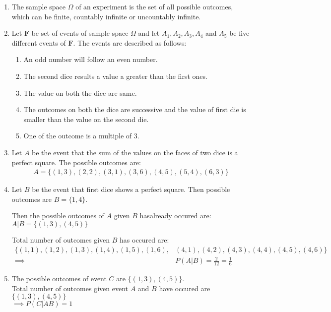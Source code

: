 \documentclass[11pt]{article}
\begin{document}
\begin{enumerate}[{1}($a$): ]
\item The sample space $\Omega$ of an experiment is the set of all possible 
	outcomes, which can be finite, countably infinite or uncountably 
	infinite.
\item Let $\mathbf{F}$ be set of events of sample space $\Omega$ and let 
	$A_1,A_2,A_3,A_4$ and $A_5$ be five different events of $\mathbf{F}$. 
		The events are described as follows: 
\begin{enumerate}[{$A$}$_1$: ]
	\item An odd number will follow an even number.
	\item The second dice results a value a greater than the first ones.
	\item The value on both the dice are same.
	\item The outcomes on both the dice are successive and the value of 
		first die is smaller than the value on the second die.
	\item One of the outcome is a multiple of 3.
\end{enumerate}

\item Let $A$ be the event that the sum of the values on the faces of two dice 
	is a perfect square. The possible outcomes are: 
	\begin{align*} 
	A = \{(1,3),(2,2),(3,1),(3,6),(4,5),(5,4),(6,3) \} 
	\end{align*} 
\item Let $B$ be the event that first dice shows a perfect square. 
	Then possible outcomes are $B=\{1,4\}$. 

	Then the possible outcomes of $A$ given $B$ hasalready occured are: 
	$A|B = \{(1,3),(4,5)\}$ 

	Total number of outcomes given $B$ has occured are:
	\begin{align*} 
	\{(1,1),(1,2),(1,3),(1,4),(1,5),(1,6),
		&(4,1),(4,2),(4,3),(4,4),(4,5),(4,6)\} \\
		\implies \qquad & P(A|B) = \frac{2}{12} = \frac{1}{6}
	\end{align*} 
\item The possible outcomes of event $C$ are $\{(1,3),(4,5)\}$. \\
	Total number of outcomes given event $A$ and $B$ have occured are 
	$\{(1,3),(4,5)\}$ \\
	$\implies P(C|AB)=1$ 
\end{enumerate}
\end{document}
